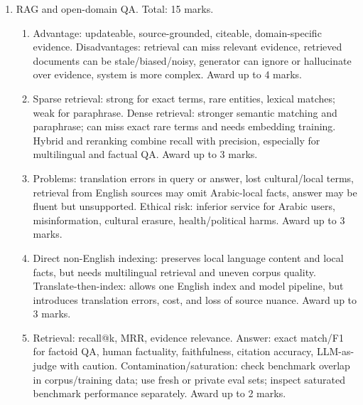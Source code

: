 \documentclass[11pt,a4paper]{article}
\begin{document}
\begin{enumerate}[leftmargin=*]
\item RAG and open-domain QA. Total: 15 marks.
\begin{enumerate}
\item Advantage: updateable, source-grounded, citeable, domain-specific evidence. Disadvantages: retrieval can miss relevant evidence, retrieved documents can be stale/biased/noisy, generator can ignore or hallucinate over evidence, system is more complex. Award up to 4 marks.
\item Sparse retrieval: strong for exact terms, rare entities, lexical matches; weak for paraphrase. Dense retrieval: stronger semantic matching and paraphrase; can miss exact rare terms and needs embedding training. Hybrid and reranking combine recall with precision, especially for multilingual and factual QA. Award up to 3 marks.
\item Problems: translation errors in query or answer, lost cultural/local terms, retrieval from English sources may omit Arabic-local facts, answer may be fluent but unsupported. Ethical risk: inferior service for Arabic users, misinformation, cultural erasure, health/political harms. Award up to 3 marks.
\item Direct non-English indexing: preserves local language content and local facts, but needs multilingual retrieval and uneven corpus quality. Translate-then-index: allows one English index and model pipeline, but introduces translation errors, cost, and loss of source nuance. Award up to 3 marks.
\item Retrieval: recall@k, MRR, evidence relevance. Answer: exact match/F1 for factoid QA, human factuality, faithfulness, citation accuracy, LLM-as-judge with caution. Contamination/saturation: check benchmark overlap in corpus/training data; use fresh or private eval sets; inspect saturated benchmark performance separately. Award up to 2 marks.
\end{enumerate}


\end{enumerate}
\end{document}

